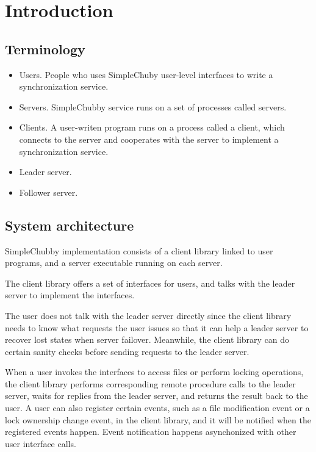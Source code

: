 \section{Introduction}

\subsection{Terminology}

\begin{itemize}
  \item Users.
  People who uses SimpleChuby user-level interfaces to write a synchronization service.
  \item Servers.
  SimpleChubby service runs on a set of processes called servers.
  \item Clients.
  A user-writen program runs on a process called a client, which connects to the server
  and cooperates with the server to implement a synchronization service.
  \item Leader server.
  \item Follower server.
\end{itemize}

\subsection{System architecture}

SimpleChubby implementation consists of a client library linked to user programs,
and a server executable running on each server.

The client library offers a set of interfaces for users, and talks with the leader
server to implement the interfaces. 

The user does not talk with the leader server directly since the client library
needs to know what requests the user issues so that it can help a leader server
to recover lost states when server failover.
Meanwhile, the client library can do certain sanity checks before sending requests
to the leader server.

When a user invokes the interfaces to access files or perform locking operations,
the client library performs corresponding remote procedure calls to the leader server,
waits for replies from the leader server, and returns the result back to the user.
A user can also register certain events,
such as a file modification event or a lock ownership change event, 
in the client library,
and it will be notified when the registered events happen.
Event notification happens asynchonized with other user interface calls.


